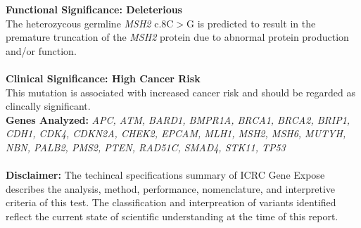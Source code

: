 \documentclass[11pt]{article}\usepackage[]{graphicx}\usepackage[]{color}
\begin{document}
\noindent
{}
\textbf{Functional Significance: Deleterious} \\
The heterozycous germline \textit{MSH2} c.8C$>$G is predicted to result in the premature truncation of the \textit{MSH2} protein due to abnormal protein production and/or function. \\ \\
\textbf{Clinical Significance: High Cancer Risk} \\
This mutation is associated with increased cancer risk and should be regarded as clincally significant. \\

\noindent
{}
\textbf{Genes Analyzed:} \textit{APC, ATM, BARD1, BMPR1A, BRCA1, BRCA2, BRIP1, CDH1, CDK4, CDKN2A, CHEK2, EPCAM, MLH1, MSH2, MSH6, MUTYH, NBN, PALB2, PMS2, PTEN, RAD51C, SMAD4, STK11, TP53} \\ 
\\
\textbf{Disclaimer:} The techincal specifications summary of ICRC Gene Expose describes the analysis, method, performance, nomenclature, and interpretive criteria of this test. The classification and interpreation of variants identified reflect the current state of scientific understanding at the time of this report. \\
\end{document}
